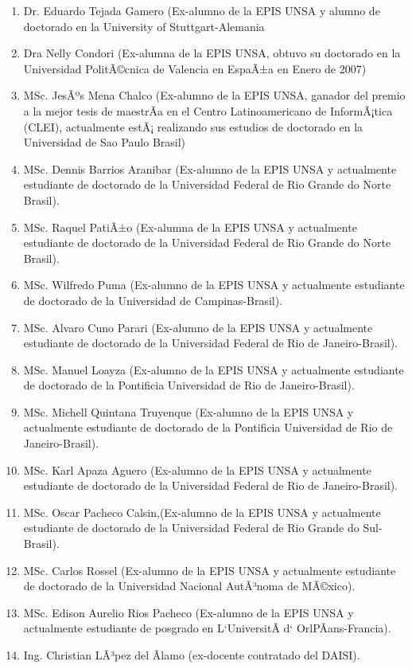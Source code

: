 \begin{enumerate}
\item Dr. Eduardo Tejada Gamero (Ex-alumno de la EPIS UNSA y alumno de doctorado en la University of Stuttgart-Alemania
\item Dra Nelly Condori (Ex-alumna de la EPIS UNSA, obtuvo su doctorado en la Universidad PolitÃ©cnica de Valencia en EspaÃ±a en Enero de 2007)
\item MSc. JesÃºs Mena Chalco (Ex-alumno de la EPIS UNSA, ganador del premio a la mejor tesis de maestrÃ­a en el Centro Latinoamericano de InformÃ¡tica (CLEI), actualmente estÃ¡ realizando sus estudios de doctorado en la Universidad de Sao Paulo Brasil)
\item MSc. Dennis Barrios Aranibar (Ex-alumno de la EPIS UNSA y actualmente estudiante de doctorado de la Universidad Federal de Rio Grande do Norte Brasil).
\item MSc. Raquel PatiÃ±o (Ex-alumna de la EPIS UNSA y actualmente estudiante de doctorado de la Universidad Federal de Rio Grande do Norte Brasil).
\item MSc. Wilfredo Puma (Ex-alumno de la EPIS UNSA y actualmente estudiante de doctorado de la Universidad de Campinas-Brasil).
\item MSc. Alvaro Cuno Parari (Ex-alumno de la EPIS UNSA y actualmente estudiante de doctorado de la Universidad Federal de Rio de Janeiro-Brasil).
\item MSc. Manuel Loayza (Ex-alumno de la EPIS UNSA y actualmente estudiante de doctorado de la Pontificia Universidad de Rio de Janeiro-Brasil).
\item MSc. Michell Quintana Truyenque (Ex-alumno de la EPIS UNSA y actualmente estudiante de doctorado de la Pontificia Universidad de Rio de Janeiro-Brasil).
\item MSc. Karl Apaza Aguero (Ex-alumno de la EPIS UNSA y actualmente estudiante de doctorado de la Universidad Federal de Rio de Janeiro-Brasil).
\item MSc. Oscar Pacheco Calsin,(Ex-alumno de la EPIS UNSA y actualmente estudiante de doctorado de la Universidad Federal de Rio Grande do Sul-Brasil).
\item MSc. Carlos Rossel (Ex-alumno de la EPIS UNSA y actualmente estudiante de doctorado de la Universidad Nacional AutÃ³noma de MÃ©xico).
\item MSc. Edison Aurelio Rios Pacheco (Ex-alumno de la EPIS UNSA y actualmente estudiante de posgrado en L`UniversitÃ d` OrlPÃans-Francia).
\item Ing. Christian LÃ³pez del Ãlamo (ex-docente contratado del DAISI).
\end{enumerate}
